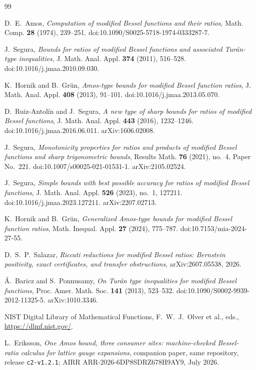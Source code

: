 \documentclass[11pt]{article}
\newcommand{\lean}[1]{\texttt{#1}}
\begin{document}
\begin{thebibliography}{99}

 D.~E.~Amos,
\emph{Computation of modified Bessel functions and their ratios},
Math. Comp. \textbf{28} (1974), 239--251.
doi:10.1090/S0025-5718-1974-0333287-7.

 J.~Segura,
\emph{Bounds for ratios of modified Bessel functions and associated
Tur\'an-type inequalities},
J. Math. Anal. Appl. \textbf{374} (2011), 516--528.
doi:10.1016/j.jmaa.2010.09.030.

 K.~Hornik and B.~Gr\"un,
\emph{Amos-type bounds for modified Bessel function ratios},
J. Math. Anal. Appl. \textbf{408} (2013), 91--101.
doi:10.1016/j.jmaa.2013.05.070.

 D.~Ruiz-Antol\'in and J.~Segura,
\emph{A new type of sharp bounds for ratios of modified Bessel
functions}, J. Math. Anal. Appl. \textbf{443} (2016), 1232--1246.
doi:10.1016/j.jmaa.2016.06.011.  arXiv:1606.02008.

 J.~Segura,
\emph{Monotonicity properties for ratios and products of modified
Bessel functions and sharp trigonometric bounds},
Results Math. \textbf{76} (2021), no.~4, Paper No.~221.
doi:10.1007/s00025-021-01531-1.  arXiv:2105.02524.

 J.~Segura,
\emph{Simple bounds with best possible accuracy for ratios of
modified Bessel functions},
J. Math. Anal. Appl. \textbf{526} (2023), no.~1, 127211.
doi:10.1016/j.jmaa.2023.127211.  arXiv:2207.02713.

 K.~Hornik and B.~Gr\"un,
\emph{Generalized Amos-type bounds for modified Bessel function
ratios}, Math. Inequal. Appl. \textbf{27} (2024), 775--787.
doi:10.7153/mia-2024-27-55.

 D.~S.~P.~Salazar,
\emph{Riccati reductions for modified Bessel ratios: Bernstein
positivity, exact certificates, and transfer obstructions},
arXiv:2607.05538, 2026.

 \'A.~Baricz and S.~Ponnusamy,
\emph{On Tur\'an type inequalities for modified Bessel functions},
Proc. Amer. Math. Soc. \textbf{141} (2013), 523--532.
doi:10.1090/S0002-9939-2012-11325-5.  arXiv:1010.3346.

 NIST Digital Library of Mathematical Functions,
F.~W.~J.~Olver et al., eds., \url{https://dlmf.nist.gov/}.

 L.~Eriksson,
\emph{One Amos bound, three consumer sites: machine-checked
Bessel-ratio calculus for lattice gauge expansions}, companion
paper, same repository, release \lean{c2-v1.2.1};
AIRR ARR-2026-6DP8SDRZ678H9AY9, July 2026.


\end{thebibliography}
\end{document}
